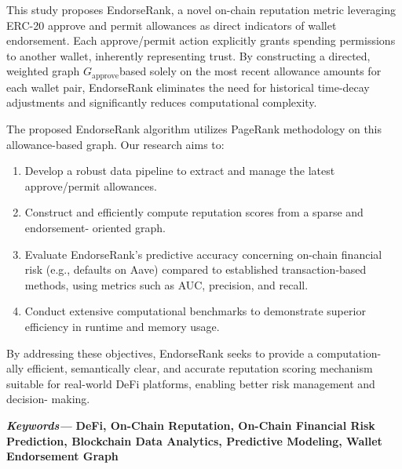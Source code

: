 \documentclass[12pt]{article}
\begin{document}
This study proposes EndorseRank, a novel on-chain reputation metric leveraging ERC-20 approve and permit allowances as direct indicators of wallet endorsement. Each approve/permit action explicitly grants spending permissions to another wallet, inherently representing trust. By constructing a directed, weighted graph $G_{\text{approve}}$based solely on the most recent allowance amounts for each wallet pair, EndorseRank eliminates the need for historical time-decay adjustments and significantly reduces computational complexity.


The proposed EndorseRank algorithm utilizes PageRank methodology on this allowance-based graph. Our research aims to:


\begin{enumerate}
\item[1.] Develop a robust data pipeline to extract and manage the latest approve/permit allowances.
\item[2.] Construct and efficiently compute reputation scores from a sparse and endorsement- oriented graph.
\item[3.] Evaluate EndorseRank's predictive accuracy concerning on-chain financial risk (e.g., defaults on Aave) compared to established transaction-based methods, using metrics such as AUC, precision, and recall.
\item[4.] Conduct extensive computational benchmarks to demonstrate superior efficiency in runtime and memory usage.
\end{enumerate}
By addressing these objectives, EndorseRank seeks to provide a computation- ally efficient, semantically clear, and accurate reputation scoring mechanism suitable for real-world DeFi platforms, enabling better risk management and decision- making.


\textbf{\emph{Keywords--- }}\textbf{DeFi, On-Chain Reputation, On-Chain Financial Risk Prediction, Blockchain Data Analytics, Predictive Modeling, Wallet Endorsement Graph}
\end{document}
